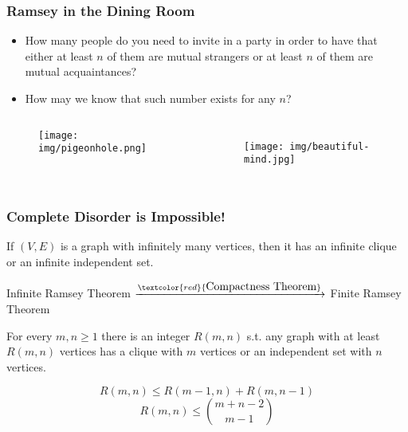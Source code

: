 \documentclass[UTF8,11pt,colorlinks,compress,openany]{beamer}%
\begin{document}
\begin{frame}\frametitle{Ramsey in the Dining Room}
	\begin{problem}
		\begin{itemize}
			\item How many people do you need to invite in a party in order to have that either at least $n$ of them are mutual strangers or at least $n$ of them are mutual acquaintances?
			\item How may we know that such number exists for any $n$?
		\end{itemize}
	\end{problem}
	\begin{columns}
			\begin{center}
				\begin{figure}
					\texttt{[image: img/pigeonhole.png]}
				\end{figure}
			\end{center}
			\begin{center}\vspace{-7pt}
			\end{center}
		\begin{figure}
		\texttt{[image: img/beautiful-mind.jpg]}
		\end{figure}
	\end{columns}
\end{frame}

\begin{frame}\frametitle{Complete Disorder is Impossible!}
	\begin{theorem}
		If $(V,E)$ is a graph with infinitely many vertices, then it has an infinite clique or an infinite independent set.
	\end{theorem}
	\centerline{Infinite Ramsey Theorem $\xrightarrow{\textcolor{red}{\mbox{Compactness Theorem}}}$ Finite Ramsey Theorem}
	\begin{theorem}
		For every $m,n\geq 1$ there is an integer $R(m,n)$ s.t. any graph with at least $R(m,n)$ vertices has a clique with $m$ vertices or an independent set with $n$ vertices.
	\end{theorem}
	\vspace{-2ex}
	\[R(m,n)\leq R(m-1,n)+R(m,n-1)\]
	\[R(m,n)\leq \binom{m+n-2}{m-1}\]
\end{frame}
\end{document}
